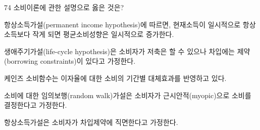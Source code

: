\begin{question}{74}
소비이론에 관한 설명으로 옳은 것은?
\begin{choices}
  \item 항상소득가설(permanent income hypothesis)에 따르면, 현재소득이 일시적으로 항상소득보다 작게 되면 평균소비성향은 일시적으로 증가한다.
  \item 생애주기가설(life-cycle hypothesis)은 소비자가 저축은 할 수 있으나 차입에는 제약(borrowing constraints)이 있다고 가정한다.
  \item 케인즈 소비함수는 이자율에 대한 소비의 기간별 대체효과를 반영하고 있다.
  \item 소비에 대한 임의보행(random walk)가설은 소비자가 근시안적(myopic)으로 소비를 결정한다고 가정한다.
  \item 항상소득가설은 소비자가 차입제약에 직면한다고 가정한다.
\end{choices}
\end{question}
